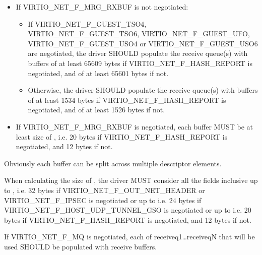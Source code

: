 
\begin{itemize}
\item If VIRTIO_NET_F_MRG_RXBUF is not negotiated:
  \begin{itemize}
    \item If VIRTIO_NET_F_GUEST_TSO4, VIRTIO_NET_F_GUEST_TSO6, VIRTIO_NET_F_GUEST_UFO,
	VIRTIO_NET_F_GUEST_USO4 or VIRTIO_NET_F_GUEST_USO6 are negotiated, the driver SHOULD populate
      the receive queue(s) with buffers of at least 65609 bytes if
      VIRTIO_NET_F_HASH_REPORT is negotiated, and of at least 65601 bytes if not.
    \item Otherwise, the driver SHOULD populate the receive queue(s)
      with buffers of at least 1534 bytes if VIRTIO_NET_F_HASH_REPORT
      is negotiated, and of at least 1526 bytes if not.
  \end{itemize}
\item If VIRTIO_NET_F_MRG_RXBUF is negotiated, each buffer MUST be at
least size of ,
i.e. 20 bytes if VIRTIO_NET_F_HASH_REPORT is negotiated, and 12 bytes if not.
\end{itemize}

\begin{note}
Obviously each buffer can be split across multiple descriptor elements.
\end{note}

When calculating the size of , the driver
MUST consider all the fields inclusive up to ,
i.e. 32 bytes if VIRTIO_NET_F_OUT_NET_HEADER or VIRTIO_NET_F_IPSEC is negotiated or up to 
i.e. 24 bytes if VIRTIO_NET_F_HOST_UDP_TUNNEL_GSO is negotiated or up to 
i.e. 20 bytes if VIRTIO_NET_F_HASH_REPORT is negotiated, and 12 bytes if not.

If VIRTIO_NET_F_MQ is negotiated, each of receiveq1\ldots receiveqN
that will be used SHOULD be populated with receive buffers.


